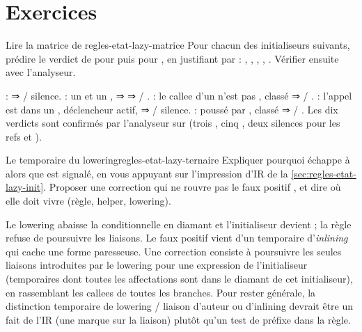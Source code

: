 \section{Exercices}
\label{sec:regles-etat-exercices}

\begin{exercice}{Lire la matrice de }{regles-etat-lazy-matrice}
Pour chacun des initialiseurs suivants, prédire le verdict de  pour  puis pour , en justifiant par  : , , , , . Vérifier ensuite avec l'analyseur.
\end{exercice}

\begin{solution}
 :  ⇒ \Info{} / silence.  : un  et un ,  ⇒  ⇒ \Warning{} / \Info.  : le callee  d'un  n'est pas , classé  ⇒ \Warning{} / \Info.  : l'appel est dans un , déclencheur actif,  ⇒ \Info{} / silence.  :  poussé par , classé  ⇒ \Warning{} / \Info. Les dix verdicts sont confirmés par l'analyseur sur  (trois \Warning, cinq \Info, deux silences pour les refs  et ).
\end{solution}

\begin{exercice}{Le temporaire du lowering}{regles-etat-lazy-ternaire}
Expliquer pourquoi  échappe à  alors que  est signalé, en vous appuyant sur l'impression d'IR de la \cref{sec:regles-etat-lazy-init}. Proposer une correction qui ne rouvre pas le faux positif , et dire où elle doit vivre (règle, helper, lowering).
\end{exercice}

\begin{solution}
Le lowering abaisse la conditionnelle en diamant et l'initialiseur devient  ; la règle refuse de poursuivre les liaisons. Le faux positif  vient d'un temporaire d'\emph{inlining} qui cache une forme paresseuse. Une correction consiste à poursuivre les seules liaisons introduites par le lowering pour une expression de l'initialiseur (temporaires  dont toutes les affectations sont dans le diamant de cet initialiseur), en rassemblant les callees de toutes les branches. Pour rester générale, la distinction \og temporaire de lowering\fg{} / \og liaison d'auteur ou d'inlining\fg{} devrait être un fait de l'IR (une marque sur la liaison) plutôt qu'un test de préfixe dans la règle.
\end{solution}

